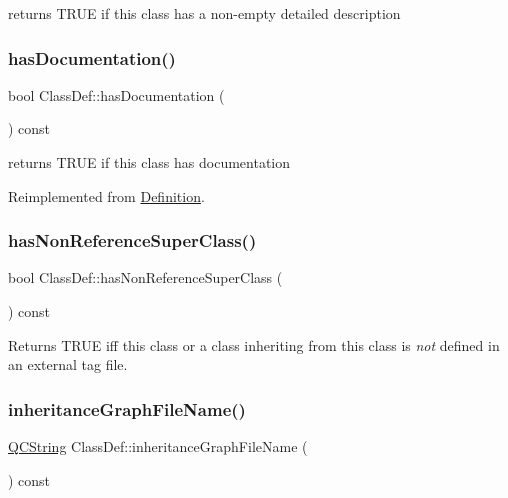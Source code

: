 returns T\+R\+UE if this class has a non-\/empty detailed description \mbox{\label{class_class_def_acb106b87cabffd7dcf3c7b692f61454b}} 
\subsubsection{\texorpdfstring{hasDocumentation()}{hasDocumentation()}}
{\footnotesize\ttfamily bool Class\+Def\+::has\+Documentation (\begin{DoxyParamCaption}{ }\end{DoxyParamCaption}) const\hspace{0.3cm}{\ttfamily [virtual]}}

returns T\+R\+UE if this class has documentation 

Reimplemented from \mbox{\hyperlink{class_definition_aa89347609a1643f6c4bc3852d9f773bb}{Definition}}.

\mbox{\label{class_class_def_a80b2ee881adb1fdb06128c27bb8c6da8}} 
\subsubsection{\texorpdfstring{hasNonReferenceSuperClass()}{hasNonReferenceSuperClass()}}
{\footnotesize\ttfamily bool Class\+Def\+::has\+Non\+Reference\+Super\+Class (\begin{DoxyParamCaption}{ }\end{DoxyParamCaption}) const\hspace{0.3cm}{\ttfamily [protected]}}

Returns {\ttfamily T\+R\+UE} iff this class or a class inheriting from this class is {\itshape not} defined in an external tag file. \mbox{\label{class_class_def_a714d75ee2764face244bcb0e4b2b9261}} 
\subsubsection{\texorpdfstring{inheritanceGraphFileName()}{inheritanceGraphFileName()}}
{\footnotesize\ttfamily \mbox{\hyperlink{class_q_c_string}{Q\+C\+String}} Class\+Def\+::inheritance\+Graph\+File\+Name (\begin{DoxyParamCaption}{ }\end{DoxyParamCaption}) const}


